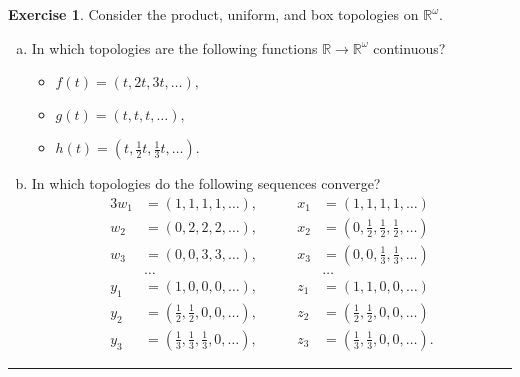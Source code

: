 \documentclass{article}
\theoremstyle{definition}
\newtheorem{exercise}{Exercise}[section]
\begin{document}
\begin{exercise}
  Consider the product, uniform, and box topologies on $\mathbb{R}^\omega$.
  \begin{enumerate}[(a)]
    \item In which topologies are the following functions $\mathbb{R}\to\mathbb{R}^\omega$ continuous?
    \begin{itemize}
      \item[] $f(t) = (t,2t,3t,\dots),$
      \item[] $g(t) = (t,t,t,\dots),$
      \item[] $h(t) = (t,\frac{1}{2}t,\frac{1}{3}t,\dots).$
    \end{itemize}
    \item In which topologies do the following sequences converge?
    \begin{alignat*}{3}
      w_1 &= (1,1,1,1,\dots),&\qquad x_1 &= (1,1,1,1,\dots) \\
      w_2 &= (0,2,2,2,\dots),&\qquad x_2 &= (0,\textstyle\frac{1}{2},\frac{1}{2},\frac{1}{2},\dots) \\
      w_3 &= (0,0,3,3,\dots),&\qquad x_3 &= (0,0,\textstyle\frac{1}{3},\frac{1}{3},\dots) \\
      & \dots && \dots \\
      y_1 &= (1,0,0,0,\dots),&\qquad z_1 &= (1,1,0,0,\dots) \\
      y_2 &= (\textstyle\frac{1}{2},\frac{1}{2},0,0,\dots),&\qquad z_2 &= (\textstyle\frac{1}{2},\frac{1}{2},0,0,\dots) \\
      y_3 &= (\textstyle\frac{1}{3},\frac{1}{3},\frac{1}{3},0,\dots),&\qquad z_3 &= (\textstyle\frac{1}{3},\frac{1}{3},0,0,\dots).
    \end{alignat*}
  \end{enumerate}
\end{exercise}\hrule
\end{document}
